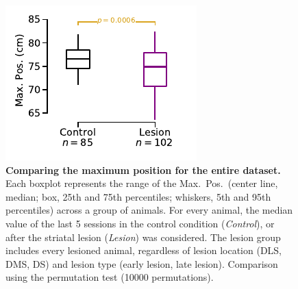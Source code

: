 \begin{figure}[!h]
  \begin{center}
    \includegraphics[scale=1]{ch-appendicies/figures/AllRatMaxPos.pdf}
    \caption[Max.\ Pos.\ Comparison]
    {\textbf{Comparing the maximum position for the entire dataset.}
    Each boxplot represents the range of the Max.\ Pos.\ (center line, median; box, 25th and 75th percentiles; whiskers, 5th and 95th percentiles) across a group of animals.
    For every animal, the median value of the last 5 sessions in the control condition (\textit{Control}), or after the striatal lesion (\textit{Lesion}) was considered.
    The lesion group includes every lesioned animal, regardless of lesion location (DLS, DMS, DS) and lesion type (early lesion, late lesion).
    Comparison using the permutation test (10000 permutations).
    }
    \label{fig:appendix:AllRatMaxPos}
  \end{center}
\end{figure} 